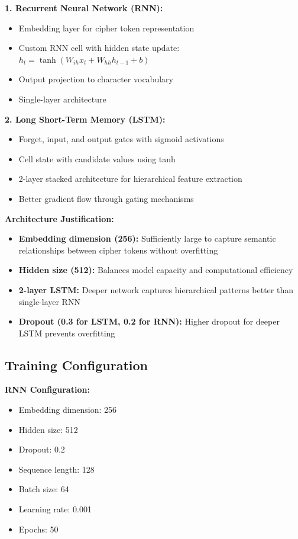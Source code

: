 \documentclass[12pt]{article}
\begin{document}
\textbf{1. Recurrent Neural Network (RNN):}
\begin{itemize}
    \item Embedding layer for cipher token representation
    \item Custom RNN cell with hidden state update: $h_t = \tanh(W_{ih}x_t + W_{hh}h_{t-1} + b)$
    \item Output projection to character vocabulary
    \item Single-layer architecture
\end{itemize}

\textbf{2. Long Short-Term Memory (LSTM):}
\begin{itemize}
    \item Forget, input, and output gates with sigmoid activations
    \item Cell state with candidate values using tanh
    \item 2-layer stacked architecture for hierarchical feature extraction
    \item Better gradient flow through gating mechanisms
\end{itemize}

\textbf{Architecture Justification:}
\begin{itemize}
    \item \textbf{Embedding dimension (256):} Sufficiently large to capture semantic relationships between cipher tokens without overfitting
    \item \textbf{Hidden size (512):} Balances model capacity and computational efficiency
    \item \textbf{2-layer LSTM:} Deeper network captures hierarchical patterns better than single-layer RNN
    \item \textbf{Dropout (0.3 for LSTM, 0.2 for RNN):} Higher dropout for deeper LSTM prevents overfitting
\end{itemize}

\subsection{Training Configuration}

\textbf{RNN Configuration:}
\begin{itemize}
    \item Embedding dimension: 256
    \item Hidden size: 512
    \item Dropout: 0.2
    \item Sequence length: 128
    \item Batch size: 64
    \item Learning rate: 0.001
    \item Epochs: 50
\end{itemize}
\end{document}
